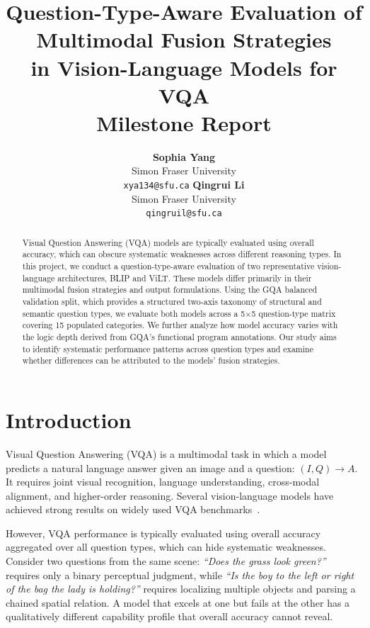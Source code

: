 \documentclass[11pt]{article}
\title{Question-Type-Aware Evaluation of Multimodal Fusion Strategies\\
in Vision-Language Models for VQA\\[0.3em]
\large Milestone Report}
\author{
  \textbf{Sophia Yang} \\
  Simon Fraser University \\
  \texttt{xya134@sfu.ca}
  \And
  \textbf{Qingrui Li} \\
  Simon Fraser University\\
  \texttt{qingruil@sfu.ca}
}
\begin{document}
\maketitle

\begin{abstract}
Visual Question Answering (VQA) models are typically evaluated using overall accuracy, which can obscure systematic weaknesses across different reasoning types. In this project, we conduct a question-type-aware evaluation of two representative vision-language architectures, BLIP and ViLT. These models differ primarily in their multimodal fusion strategies and output formulations. Using the GQA balanced validation split, which provides a structured two-axis taxonomy of structural and semantic question types, we evaluate both models across a 5$\times$5 question-type matrix covering 15 populated categories. We further analyze how model accuracy varies with the logic depth derived from GQA's functional program annotations. Our study aims to identify systematic performance patterns across question types and examine whether differences can be attributed to the models' fusion strategies.
\end{abstract}

\section{Introduction}

Visual Question Answering (VQA) is a multimodal task in which a model predicts a natural language answer given an image and a question: $(I, Q) \rightarrow A$. It requires joint visual recognition, language understanding, cross-modal alignment, and higher-order reasoning. Several vision-language models have achieved strong results on widely used VQA benchmarks~\cite{tan2019lxmert,lu2019vilbert,kim2021vilt,li2022blip}.

However, VQA performance is typically evaluated using overall accuracy aggregated over all question types, which can hide systematic weaknesses. Consider two questions from the same scene: \emph{``Does the grass look green?''} requires only a binary perceptual judgment, while \emph{``Is the boy to the left or right of the bag the lady is holding?''} requires localizing multiple objects and parsing a chained spatial relation. A model that excels at one but fails at the other has a qualitatively different capability profile that overall accuracy cannot reveal.
\end{document}
